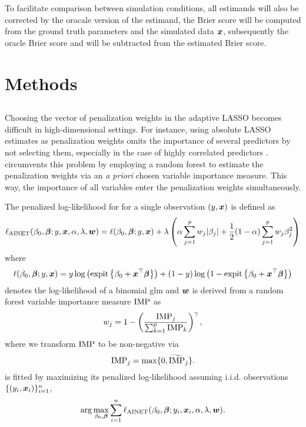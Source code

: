 \documentclass[a4paper, 11pt]{article}\usepackage[]{graphicx}\usepackage[]{color}
\begin{document}
To facilitate comparison between simulation conditions, all estimands will also
be corrected by the oracale version of the estimand, \eg the Brier score will be
computed from the ground truth parameters and the simulated data $\text{\boldmath$x$}$,
subsequently the oracle Brier score and will be subtracted from the estimated
Brier score.

\section{Methods} \label{sec:methods}

\subsection{\ainet}

Choosing the vector of penalization weights in the adaptive LASSO becomes difficult
in high-dimensional settings. For instance, using absolute LASSO estimates as penalization
weights omits the importance of several predictors by not selecting them, 
especially in the case of highly correlated predictors \citep{Algamal2015}.
\ainet{} circumvents this problem by employing a random forest to estimate the 
penalization weights via an \emph{a priori} chosen variable importance measure.
This way, the importance of all variables enter the penalization weights simultaneously.

The penalized log-likelihood for \ainet{} for a single observation $(y, \text{\boldmath$x$})$
is defined as
$$\ell_{\text{AINET}}(\beta_0, \text{\boldmath$\beta$}; y, \text{\boldmath$x$}, \alpha, \lambda, \text{\boldmath$w$}) = 
  \ell(\beta_0, \text{\boldmath$\beta$}; y, \text{\boldmath$x$}) + \lambda\left(\alpha \sum_{j = 1}^p{w_j\lvert\beta_j\rvert} + \frac{1}{2} (1-\alpha) \sum_{j=1}^p{w_j\beta_j^2} \right)$$
where
$$\ell(\beta_0, \text{\boldmath$\beta$}; y, \text{\boldmath$x$}) = 
  y \log\left(\operatorname{expit}\left\{\beta_0 + \text{\boldmath$x$}^\top\text{\boldmath$\beta$}\right\}\right)
  + (1 - y) \log\left(1 - \operatorname{expit}\left\{\beta_0 + \text{\boldmath$x$}^\top\text{\boldmath$\beta$}\right\}\right)$$
denotes the log-likelihood of a binomial glm and
$\text{\boldmath$w$}$ is derived from a random forest variable importance measure $\operatorname{IMP}$ as
$$w_j = 1 - \left(\frac{\operatorname{IMP}_j}{\sum_{k=1}^p \operatorname{IMP}_k}\right)^\gamma,$$
where we transform $\operatorname{IMP}$ to be non-negative via
$$\operatorname{IMP}_j = \max\{0, \widetilde{\operatorname{IMP}}_j\}.$$
\ainet{} is fitted by maximizing its penalized log-likelihood assuming i.i.d.
observations $\{(y_i, \text{\boldmath$x$}_i)\}_{i=1}^n$, \ie
$$\arg\max_{\beta_0, \text{\boldmath$\beta$}} \sum_{i = 1}^n \ell_{\text{AINET}}(\beta_0,
\text{\boldmath$\beta$}; y_i, \text{\boldmath$x$}_i, \alpha, \lambda, \text{\boldmath$w$}).$$
\end{document}
